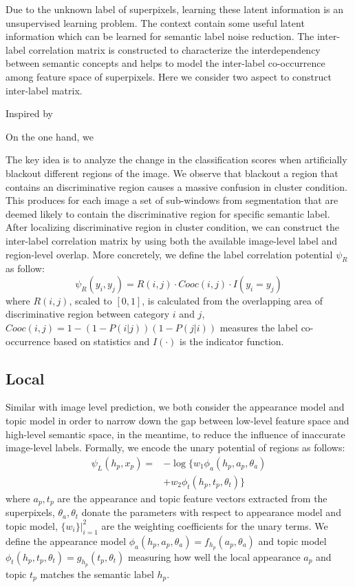 Due to the unknown label of superpixels, learning these latent information is an unsupervised learning problem. The context contain some useful latent information which can be learned for semantic label noise reduction. The inter-label correlation matrix is constructed to characterize the interdependency between semantic concepts and helps to model the inter-label co-occurrence among feature space of superpixels. Here we consider two aspect to construct inter-label matrix.

Inspired by \cite{russakovsky2014imagenet}

On the one hand, we

The key idea is to analyze the change in the classification scores when artificially blackout different regions of the image. We observe that blackout a region that contains an discriminative region causes a massive confusion in cluster condition. This produces for each image a set of sub-windows from segmentation that are deemed likely to contain the discriminative region for specific semantic label. After localizing discriminative region in cluster condition, we can construct the inter-label correlation matrix by using both the available image-level label and region-level overlap. More concretely, we define the label correlation potential $\psi_R$ as follow:
\begin{equation}
    \psi_{R}(y_i,y_j) = R(i,j) \cdot Cooc(i,j) \cdot I(y_i=y_j)
\end{equation}
where $R(i,j)$, scaled to $[0,1]$, is calculated from the overlapping area of discriminative region between category $i$ and $j$, $Cooc(i,j) = 1-(1-P(i|j))(1-P(j|i))$ measures the label co-occurrence based on statistics and $I(\cdot)$ is the indicator function.

\subsection{Local}
Similar with image level prediction, we both consider the appearance model and topic model in order to narrow down the gap between low-level feature space and high-level semantic space, in the meantime, to reduce the influence of inaccurate image-level labels.
Formally, we encode the unary potential of regions as follows:
\begin{equation}
    \begin{aligned}
        \psi_{L}(h_p,x_p) = &- \log \big\{ w_1\phi_a(h_p,a_p,\theta_a) \\
        &+ w_2\phi_t(h_p,t_p,\theta_t) \big\}
    \end{aligned}
\end{equation}
where $a_p, t_p$ are the appearance and topic feature vectors extracted from the superpixels, $\theta_a, \theta_t$ donate the parameters with respect to appearance model and topic model, $\{w_i\}|_{i=1}^2$ are the weighting coefficients for the unary terms. We define the appearance model $\phi_a(h_p,a_p,\theta_a) = f_{h_p}(a_p,\theta_a)$ and topic model $\phi_t(h_p,t_p,\theta_t) = g_{h_p}(t_p,\theta_t)$ measuring how well the local appearance $a_p$ and topic $t_p$ matches the semantic label $h_p$.

